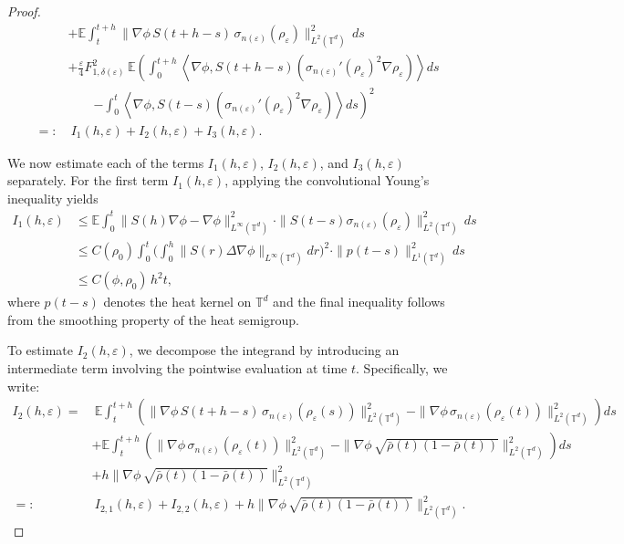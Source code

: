 \documentclass[UTF-8,reqno]{amsart}
\numberwithin{equation}{section}
\def\leq{\leqslant}
\def\leq{\leqslant}
\begin{document}
\begin{proof}
\begin{align*}
&+ \mathbb{E} \int_t^{t+h} \| \nabla\phi\, S(t+h - s)\, \sigma_{n(\varepsilon)}(\rho_{\varepsilon}) \|_{L^2(\mathbb{T}^d)}^2\, ds \\
&+ \frac{\varepsilon}{4} F_{1,\delta(\varepsilon)}^2\, \mathbb{E} \left( \int_0^{t+h} \left\langle \nabla\phi, S(t+h - s) \left( \sigma_{n(\varepsilon)}'(\rho_{\varepsilon})^2 \nabla \rho_{\varepsilon} \right) \right\rangle ds \right. \\
&\qquad \left. - \int_0^t \left\langle \nabla\phi, S(t - s) \left( \sigma_{n(\varepsilon)}'(\rho_{\varepsilon})^2 \nabla \rho_{\varepsilon} \right) \right\rangle ds \right)^2 \\
=:&\ I_1(h,\varepsilon) + I_2(h,\varepsilon) + I_3(h,\varepsilon).
\end{align*}

We now estimate each of the terms $I_1(h,\varepsilon)$, $I_2(h,\varepsilon)$, and $I_3(h,\varepsilon)$ separately. For the first term $I_1(h,\varepsilon)$, applying the convolutional Young's inequality yields
\begin{align*}
I_1(h,\varepsilon) 
&\leq \mathbb{E} \int_0^t \| S(h)\nabla\phi - \nabla\phi \|_{L^\infty(\mathbb{T}^d)}^2 
\cdot \| S(t - s)\sigma_{n(\varepsilon)}(\rho_{\varepsilon}) \|_{L^{2}(\mathbb{T}^d)}^2\, ds \\
&\leq C(\rho_0)\int_0^t \Big(\int^h_0\| S(r)\Delta\nabla\phi \|_{L^\infty(\mathbb{T}^d)}dr\Big)^2 
\cdot \| p(t - s) \|_{L^1(\mathbb{T}^d)}^2\, ds \\
&\leq C(\phi,\rho_0)\, h^2 t,
\end{align*}
where $p(t - s)$ denotes the heat kernel on $\mathbb{T}^d$ and the final inequality follows from the smoothing property of the heat semigroup.


To estimate $I_2(h,\varepsilon)$, we decompose the integrand by introducing an intermediate term involving the pointwise evaluation at time $t$. Specifically, we write:
\begin{align*}
I_2(h,\varepsilon) 
=&\ \mathbb{E} \int_t^{t+h} \left( \| \nabla\phi\, S(t+h-s)\, \sigma_{n(\varepsilon)}(\rho_{\varepsilon}(s)) \|_{L^2(\mathbb{T}^d)}^2 
- \| \nabla\phi\, \sigma_{n(\varepsilon)}(\rho_{\varepsilon}(t)) \|_{L^2(\mathbb{T}^d)}^2 \right) ds \\
&+ \mathbb{E} \int_t^{t+h} \left( \| \nabla\phi\, \sigma_{n(\varepsilon)}(\rho_{\varepsilon}(t)) \|_{L^2(\mathbb{T}^d)}^2 
- \| \nabla\phi\, \sqrt{\bar{\rho}(t)(1 - \bar{\rho}(t))} \|_{L^2(\mathbb{T}^d)}^2 \right) ds \\
&+ h \| \nabla\phi\, \sqrt{\bar{\rho}(t)(1 - \bar{\rho}(t))} \|_{L^2(\mathbb{T}^d)}^2 \\
=:&\ I_{2,1}(h,\varepsilon) + I_{2,2}(h,\varepsilon) + h \| \nabla\phi\, \sqrt{\bar{\rho}(t)(1 - \bar{\rho}(t))} \|_{L^2(\mathbb{T}^d)}^2.
\end{align*}


\end{proof}
\end{document}
